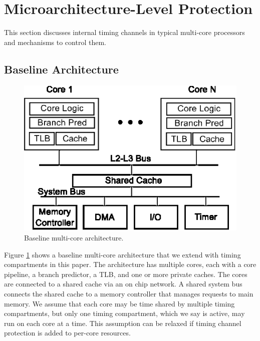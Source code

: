 \section{Microarchitecture-Level Protection}

This section discusses internal timing channels in typical
multi-core processors and mechanisms to control them.

\subsection{Baseline Architecture}

    \begin{figure}
        \begin{center}
            \includegraphics{figs/baseline.eps}
            \caption{Baseline multi-core architecture.}
            \label{fig:baseline}
        \end{center}
    \end{figure}

Figure \ref{fig:baseline} shows a baseline multi-core architecture that we
extend with timing compartments in this paper. The architecture
has multiple cores, each with a core pipeline, a branch predictor, a TLB,
and one or more private caches. 
The cores are connected to a shared cache via an on chip network. A shared system 
bus connects the shared cache to a memory controller that manages requests to 
main memory.
We assume that each core may be time shared by multiple timing
compartments, but only one timing compartment, which we say is active, may run on each core
at a time. This assumption can be relaxed if timing channel protection
is added to per-core resources.



